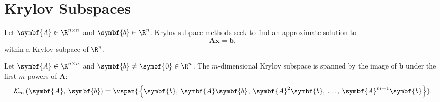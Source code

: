 \documentclass{article}
\begin{document}
\section{Krylov Subspaces}
Let \(\symbf{A} \in \R^{n \times n}\) and \(\symbf{b} \in \R^n\).
Krylov subpace methods seek to find an approximate solution to
\begin{equation*}
    \symbf{A} \symbf{x} = \symbf{b},
\end{equation*}
within a Krylov subpace of \(\R^n\).
\begin{definition}
    Let \(\symbf{A} \in \R^{n \times n}\) and \(\symbf{b} \neq \symbf{0} \in \R^n\).
    The \(m\)-dimensional Krylov subspace is spanned by the image of
    \(\symbf{b}\) under the first \(m\) powers of \(\symbf{A}\):
    \begin{equation*}
        \mathcal{K}_m\left( \symbf{A},\: \symbf{b} \right) = \vspan{\left\{ \symbf{b},\: \symbf{A}\symbf{b},\: \symbf{A}^2\symbf{b},\: \ldots,\: \symbf{A}^{m-1}\symbf{b} \right\}}.
    \end{equation*}
\end{definition}
\end{document}

